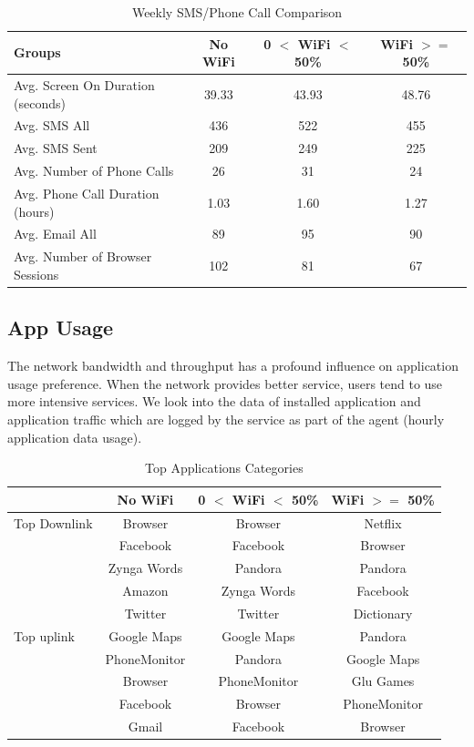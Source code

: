 \begin{table}[h!tbp] 
\caption{Weekly SMS/Phone Call Comparison} 
\label{table:sms_phone}
\centering 
\begin{tabular}{|l|c|c|c|}
\hline
Groups & No WiFi& 0 $<$ WiFi $<$ 50\% & WiFi $>=$ 50\%\\
\hline Avg. Screen On Duration (seconds) & 39.33 & 43.93 & 48.76\\
\hline Avg. SMS All& 436 & 522 & 455  \\ 
\hline Avg. SMS Sent & 209 & 249 & 225 \\
\hline Avg. Number of Phone Calls & 26 & 31 & 24 \\
\hline Avg. Phone Call Duration (hours) & 1.03 & 1.60 & 1.27 \\
\hline Avg. Email All & 89 & 95 & 90\\
\hline Avg. Number of Browser Sessions & 102 & 81 & 67\\
\hline
\end{tabular}
\end{table}

\subsection{App Usage}\label{app}

The network bandwidth and throughput has a profound influence on application usage preference. When the network provides better service,
users tend to use more intensive services.   We look into the data of installed application and application traffic which are logged by the service as part of the agent (hourly application data usage). 

\begin{table}[h!tbp] 
\caption{Top Applications Categories} 
\label{table:app_categories}
\centering 
\begin{tabular}{|l|c|c|c|}
\hline
& No WiFi & 0 $<$ WiFi $<$ 50\% & WiFi $>=$ 50\%\\
\hline
Top Downlink & Browser & Browser & Netflix\\ 
					& Facebook & Facebook & Browser\\
					& Zynga Words & Pandora & Pandora\\
					& Amazon & Zynga Words & Facebook\\
					& Twitter & Twitter & Dictionary\\
\hline
Top uplink & Google Maps & Google Maps & Pandora\\ 
					& PhoneMonitor & Pandora & Google Maps\\
					& Browser & PhoneMonitor & Glu Games\\
					& Facebook &Browser&PhoneMonitor\\
					& Gmail & Facebook&Browser\\
\hline
\end{tabular}
\end{table}


